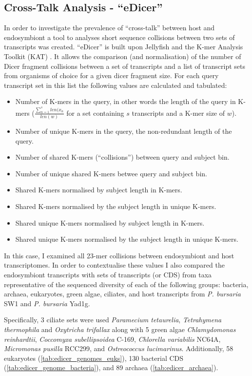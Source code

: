 \subsection{Cross-Talk Analysis - ``eDicer''}

In order to investigate the prevalence of ``cross-talk'' between 
host and endosymbiont a tool to analyses short sequence collisions between two sets
of transcripts was created.  ``eDicer'' is built upon Jellyfish \citep{Marcais2011}
and the K-mer Analysis Toolkit (KAT) \citep{ClavijoKAT}.  It allows
the comparison (and normalisation) of the number of Dicer fragment collisions
between a set of transcripts and a list of transcript sets from organisms
of choice for a given dicer fragment size.  
For each query transcript set in this list the following
values are calculated and tabulated:
\begin{itemize}
    \item Number of K-mers in the query, in other words the length of the query
        in K-mers (\(\frac{\sum^s_{n=1} len(x_{n}}{len(w)}\)
        for a set containing \(s\) transcripts and a K-mer size of \(w\)).
    \item Number of unique K-mers in the query, the non-redundant length of 
        the query.
    \item Number of shared  K-mers (``collisions'') between query and subject bin.
    \item Number of unique shared K-mers betwee query and subject bin.
    \item Shared K-mers normalised by subject length in K-mers.
    \item Shared K-mers normalised by the subject length in unique K-mers.
    \item Shared unique K-mers normalised by subject length in K-mers.
    \item Shared unique K-mers normalised by the subject length in unique K-mers.
\end{itemize}

In this case, I examined all 23-mer collisions between endosymbiont 
and host transcriptomes. In order to contextualise these
values I also compared the endosymbiont transcripts with 
sets of transcripts (or CDS) from taxa representative of the 
sequenced diversity of each of the
following groups: bacteria, archaea, eukaryotes, green algae, ciliates,
and host transcripts from \textit{P. bursaria} SW1 and \textit{P. bursaria} Yad1g.

Specifically, 3 ciliate sets were used \textit{Paramecium tetaurelia}, 
\textit{Tetrahymena thermophila} and \textit{Oxytricha trifallax} along with
5 green algae \textit{Chlamydomonas reinhardtii}, \textit{Coccomyxa subellipsoidea}
C-169, \textit{Chlorella variabilis} NC64A, \textit{Micromonas pusilla} RCC299, and
\textit{Ostreococcus lucimarinus}.
Additionally, 58 eukaryotes (\cref{tab:edicer_genomes_euks}),
130 bacterial CDS (\cref{tab:edicer_genome_bacteria}), and 
89 archaea (\cref{tab:edicer_archaea}). 

